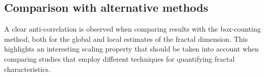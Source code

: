 \subsection{Comparison with alternative methods}

A clear anti-correlation is observed when comparing results with the box-counting method, both for the global and local estimates of the fractal dimension. This highlights an interesting scaling property that should be taken into account when comparing studies that employ different techniques for quantifying fractal characteristics.
